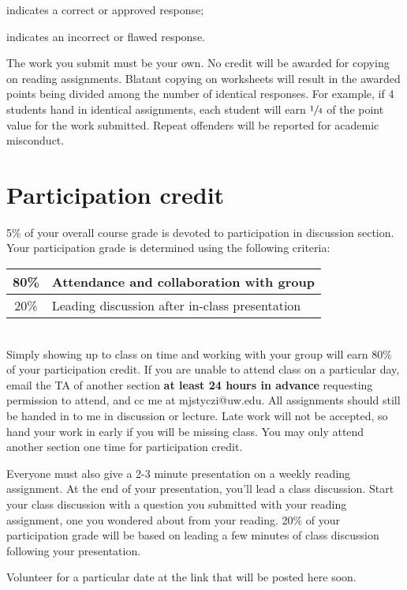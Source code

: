 \documentclass[12pt,letterpaper]{article}
\newcommand{\ch}{{\ding{51}}}        %
\newcommand{\X}{{\ding{55}}}        %
\begin{document}
	{\ch} indicates a correct or approved response;
	
	{\X} indicates an incorrect or flawed response.
	
	The work you submit must be your own. No credit will be awarded for copying on reading assignments. Blatant copying on worksheets will result in the awarded points being divided among the number of identical responses. For example, if 4 students hand in identical assignments, each student will earn $\sfrac{1}{4}$ of the point value for the work submitted. Repeat offenders will be reported for academic misconduct.

\section{Participation credit}
	5\% of your overall course grade is devoted to participation in discussion section. Your participation grade is determined using the following criteria:\\

	\begin{tabular}{ | c | l | }
		\hline
		80\%	&	Attendance and collaboration with group\\
		\hline
		20\%	&	Leading discussion after in-class presentation\\
		\hline
	\end{tabular}\\
	
Simply showing up to class on time and working with your group will earn 80\% of your participation credit. If you are unable to attend class on a particular day, email the TA of another section \textbf{at least 24 hours in advance} requesting permission to attend, and cc me at \mbox{mjstyczi@uw.edu}. All assignments should still be handed in to me in discussion or lecture. Late work will not be accepted, so hand your work in early if you will be missing class. You may only attend another section one time for participation credit.

Everyone must also give a 2-3 minute presentation on a weekly reading assignment. At the end of your presentation, you'll lead a class discussion. Start your class discussion with a question you submitted with your reading assignment, one you wondered about from your reading. 20\% of your participation grade will be based on leading a few minutes of class discussion following your presentation.

Volunteer for a particular date at the link that will be posted here soon.

\thispagestyle{empty}
\end{document}
